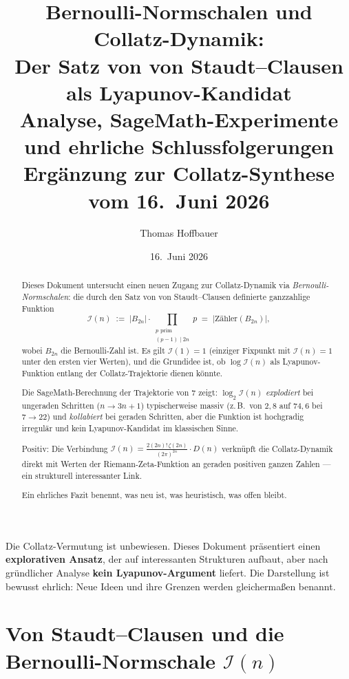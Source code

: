 \documentclass[12pt,a4paper]{article}
\title{%
  Bernoulli-Normschalen und Collatz-Dynamik:\\[0.3em]
  Der Satz von von Staudt--Clausen als Lyapunov-Kandidat\\[0.5em]
  \large Analyse, SageMath-Experimente und ehrliche Schlussfolgerungen\\[0.3em]
  \large Ergänzung zur Collatz-Synthese vom 16.\ Juni 2026%
}
\author{Thomas Hoffbauer}
\date{16.\ Juni 2026}
\newcommand{\abs}[1]{\lvert#1\rvert}
\newcommand{\In}{\mathcal{I}}      %
\newcommand{\Denom}[1]{D(#1)}     %
\begin{document}
\maketitle

\begin{abstract}
Dieses Dokument untersucht einen neuen Zugang zur Collatz-Dynamik via
\emph{Bernoulli-Normschalen}: die durch den Satz von von Staudt--Clausen
definierte ganzzahlige Funktion
\[
  \In(n) \;:=\; \abs{B_{2n}} \cdot \prod_{\substack{p \text{ prim}\\(p-1)\mid 2n}} p
  \;=\; \bigl|\text{Zähler}(B_{2n})\bigr|,
\]
wobei $B_{2n}$ die Bernoulli-Zahl ist. Es gilt $\In(1) = 1$ (einziger Fixpunkt mit
$\In(n) = 1$ unter den ersten vier Werten), und die Grundidee ist, ob $\log \In(n)$
als Lyapunov-Funktion entlang der Collatz-Trajektorie dienen könnte.

Die SageMath-Berechnung der Trajektorie von $7$ zeigt: $\log_2 \In(n)$
\emph{explodiert} bei ungeraden Schritten ($n \to 3n+1$) typischerweise massiv
(z.\,B.\ von $2{,}8$ auf $74{,}6$ bei $7\to 22$) und \emph{kollabiert} bei geraden
Schritten, aber die Funktion ist hochgradig irregulär und kein Lyapunov-Kandidat
im klassischen Sinne.

Positiv: Die Verbindung $\In(n) = \frac{2(2n)!\,\zeta(2n)}{(2\pi)^{2n}} \cdot \Denom{n}$
verknüpft die Collatz-Dynamik direkt mit Werten der Riemann-Zeta-Funktion an
geraden positiven ganzen Zahlen --- ein strukturell interessanter Link.

Ein ehrliches Fazit benennt, was neu ist, was heuristisch, was offen bleibt.
\end{abstract}

\tableofcontents

\bigskip
\begin{tcolorbox}[warnung, title={Einordnung}]
Die Collatz-Vermutung ist unbewiesen. Dieses Dokument präsentiert einen
\textbf{explorativen Ansatz}, der auf interessanten Strukturen aufbaut,
aber nach gründlicher Analyse \textbf{kein Lyapunov-Argument} liefert.
Die Darstellung ist bewusst ehrlich: Neue Ideen und ihre Grenzen werden
gleichermaßen benannt.
\end{tcolorbox}

\section{Von Staudt--Clausen und die Bernoulli-Normschale \texorpdfstring{$\In(n)$}{I(n)}}
\label{sec:definition}
\end{document}
